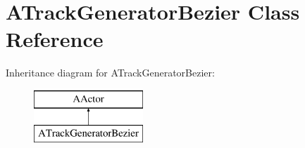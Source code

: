 \hypertarget{class_a_track_generator_bezier}{}\section{A\+Track\+Generator\+Bezier Class Reference}
\label{class_a_track_generator_bezier}
Inheritance diagram for A\+Track\+Generator\+Bezier\+:\begin{figure}[H]
\begin{center}
\leavevmode
\includegraphics[height=2.000000cm]{class_a_track_generator_bezier}
\end{center}
\end{figure}

